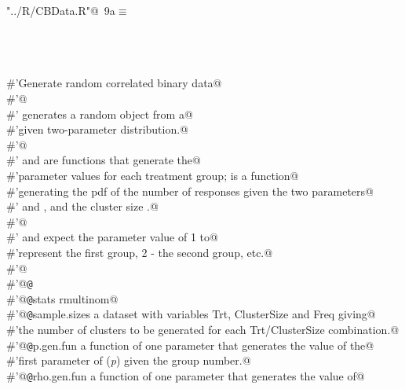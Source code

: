 \documentclass[reqno]{amsart}
\renewcommand{\NWtarget}[2]{\hypertarget{#1}{#2}}
\begin{document}
\begin{flushleft} \small\label{scrap14}\raggedright\small
\NWtarget{nuweb9a}{} \verb@"../R/CBData.R"@\nobreak\ {\footnotesize {9a}}$\equiv$
\vspace{-1ex}
\begin{list}{}{} \item
\mbox{}\verb@@\\
\mbox{}\verb@@\\
\mbox{}\verb@@\\
\mbox{}\verb@#'Generate random correlated binary data@\\
\mbox{}\verb@#'@\\
\mbox{}\verb@#' generates a random  object from a@\\
\mbox{}\verb@#'given two-parameter distribution.@\\
\mbox{}\verb@#'@\\
\mbox{}\verb@#' and  are functions that generate the@\\
\mbox{}\verb@#'parameter values for each treatment group;  is a function@\\
\mbox{}\verb@#'generating the pdf of the number of responses given the two parameters@\\
\mbox{}\verb@#' and , and the cluster size .@\\
\mbox{}\verb@#'@\\
\mbox{}\verb@#' and  expect the parameter value of 1 to@\\
\mbox{}\verb@#'represent the first group, 2 - the second group, etc.@\\
\mbox{}\verb@#'@\\
\mbox{}\verb@#'@{\tt @}\verb@export@\\
\mbox{}\verb@#'@{\tt @}\verb@importFrom stats rmultinom@\\
\mbox{}\verb@#'@{\tt @}\verb@param sample.sizes a dataset with variables Trt, ClusterSize and Freq giving@\\
\mbox{}\verb@#'the number of clusters to be generated for each Trt/ClusterSize combination.@\\
\mbox{}\verb@#'@{\tt @}\verb@param p.gen.fun a function of one parameter that generates the value of the@\\
\mbox{}\verb@#'first parameter of  (\emph{p}) given the group number.@\\
\mbox{}\verb@#'@{\tt @}\verb@param rho.gen.fun a function of one parameter that generates the value of@\\

\end{list}
\end{flushleft}
\end{document}
